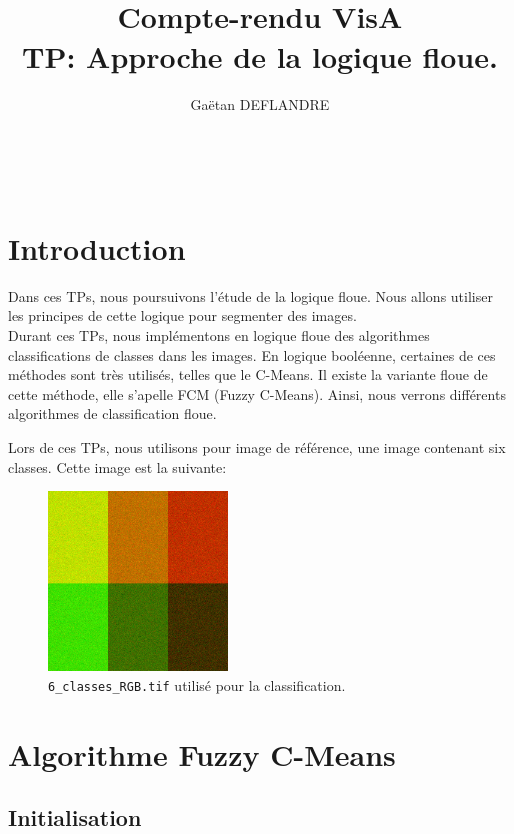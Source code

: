 \documentclass[a4paper,11pt]{article}
\title{
  \noindent\hrulefill \\
  \vspace{10mm}
  \textbf{Compte-rendu VisA} \\
  \vspace{5mm}
  TP: Approche de la logique floue.
}
\author{Gaëtan DEFLANDRE}
\begin{document}
\maketitle
\noindent\hrulefill \\


\section*{Introduction}

Dans ces TPs, nous poursuivons l'étude de la logique floue. Nous allons 
utiliser les principes de cette logique pour segmenter des images. \\

Durant ces TPs, nous implémentons en logique floue des algorithmes 
classifications de classes dans les images. En logique booléenne, 
certaines de ces méthodes sont très utilisés, telles que le C-Means. Il 
existe la variante floue de cette méthode, elle s'apelle FCM (Fuzzy 
C-Means). Ainsi, nous verrons différents algorithmes de classification 
floue.\\


\newpage



Lors de ces TPs, nous utilisons pour image de référence, une image 
contenant six classes. Cette image est la suivante:

\begin{figure}[H]
  \begin{center} 
    \includegraphics[width=180px]{../img/6_classes_RGB.png}
    \caption{\texttt{6\_classes\_RGB.tif} utilisé pour la classification.}
  \end{center}
\end{figure}

\section{Algorithme Fuzzy C-Means}

\subsection{Initialisation}
\end{document}
